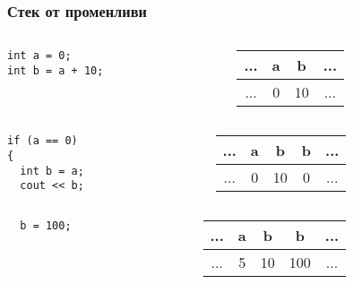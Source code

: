 \documentclass{beamer}
\begin{document}
\begin{frame}[fragile]
\frametitle{Стек от променливи}


\begin{columns}[c]
  \begin{column}{0.3\textwidth}
\begin{lstlisting}
int a = 0;
int b = a + 10;
\end{lstlisting}

  \end{column}
  \begin{column}{0.7\textwidth}
\begin{tabular}{ c | c | c | c}
\hline
... & a & b &  ...\\\hline
... & 0 & 10 & ... \\\hline
  
\end{tabular}

  \end{column}
\end{columns}

\pause

\begin{columns}[c]
  \begin{column}{0.3\textwidth}
\begin{lstlisting}
if (a == 0)
{
  int b = a;
  cout << b;
\end{lstlisting}

  \end{column}
  \begin{column}{0.7\textwidth}
\begin{tabular}{ c | c | c | c | c}
\hline
... & a & b &  \alert{b} & ...\\\hline
... & 0 & 10 & \alert {0} & ... \\\hline
  
\end{tabular}

  \end{column}
\end{columns}

\pause

\begin{columns}[c]
  \begin{column}{0.3\textwidth}
\begin{lstlisting}
  b = 100;
\end{lstlisting}

  \end{column}
  \begin{column}{0.7\textwidth}
\begin{tabular}{ c | c | c | c | c}
\hline
... & a & b & b &  ...\\\hline
... & 5 & 10& \alert{100} & ... \\\hline
  

\end{tabular}
\end{column}
\end{columns}
\end{frame}
\end{document}
